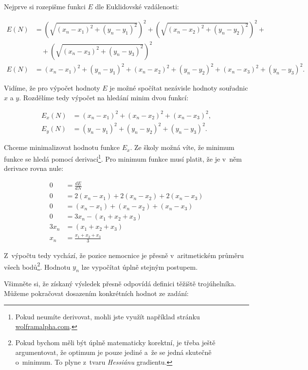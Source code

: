 \documentclass[12pt,a4paper]{article}
\begin{document}
Nejprve si rozepišme funkci $E$ dle Euklidovské vzdálenosti:

\begin{align}
E(N) &= \left(\sqrt{(x_n-x_1)^2 + (y_n - y_1)^2}\right)^2 +
	\left(\sqrt{(x_n-x_2)^2 + (y_n - y_2)^2}\right)^2 + \nonumber \\
	&\hspace{1em} + \left(\sqrt{(x_n-x_3)^2 + (y_n - y_3)^2}\right)^2 \nonumber \\
E(N) &= (x_n-x_1)^2 + (y_n - y_1)^2 +
	(x_n-x_2)^2 + (y_n - y_2)^2 +
	(x_n-x_3)^2 + (y_n - y_3)^2 \nonumber.
\end{align}

Vidíme, že pro výpočet hodnoty $E$ je možné spočítat nezávisle hodnoty souřadnic
$x$ a $y$. Rozdělíme tedy výpočet na hledání minim dvou funkcí:

\begin{align}
E_x(N) &= (x_n-x_1)^2 + (x_n-x_2)^2 + (x_n-x_3)^2 \nonumber, \\
E_y(N) &= (y_n-y_1)^2 + (y_n-y_2)^2 + (y_n-y_3)^2 \nonumber.
\end{align}

Chceme minimalizovat hodnotu funkce $E_x$. Ze školy možná víte, že minimum
funkce se hledá pomocí derivací\footnote{Pokud neumíte derivovat, mohli jste
využít například stránku \url{wolframalpha.com}.}. Pro minimum funkce musí
platit, že je v~něm derivace rovna nule:

\begin{align}
0 &= \frac{dE}{dN} \nonumber \\
0 &= 2(x_n-x_1) + 2(x_n-x_2) + 2(x_n-x_3) \nonumber \\
0 &= (x_n-x_1) + (x_n-x_2) + (x_n-x_3) \nonumber \\
0 &= 3x_n - (x_1 + x_2 + x_3) \nonumber \\
3x_n &= (x_1 + x_2 + x_3) \nonumber \\
x_n &= \frac{x_1 + x_2 + x_3}{3} \nonumber
\end{align}

Z~výpočtu tedy vychází, že pozice nemocnice je přesně v~aritmetickém průměru
všech bodů\footnote{Pokud bychom měli být úplně matematicky korektní, je třeba
ještě argumentovat, že optimum je pouze jediné a~že se jedná skutečně o~minimum.
To plyne z~tvaru \textit{Hessiánu} gradientu.}. Hodnotu $y_n$ lze vypočítat
úplně stejným postupem.

Všimněte si, že získaný výsledek přesně odpovídá definici těžiště trojúhelníka.
Můžeme pokračovat dosazením konkrétních hodnot ze zadání:
\end{document}
